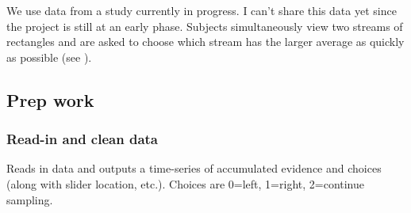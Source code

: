 \documentclass[
]{book}
\begin{document}
We use data from a study currently in progress. I can't share this data yet since the project is still at an early phase. Subjects simultaneously view two streams of rectangles and are asked to choose which stream has the larger average as quickly as possible (see \citep{tsetsos2016}).

\hypertarget{prep-work}{%
\subsection{Prep work}\label{prep-work}}

\hypertarget{read-in-and-clean-data}{%
\subsubsection*{Read-in and clean data}\label{read-in-and-clean-data}}

Reads in data and outputs a time-series of accumulated evidence and choices (along with slider location, etc.). Choices are 0=left, 1=right, 2=continue sampling.
\end{document}
